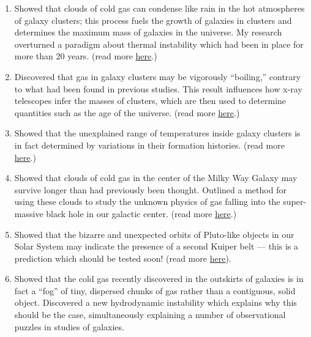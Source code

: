 \documentclass[11pt]{article}
\newenvironment{outerlist}[1][\enskip\textbullet]%
        {\begin{enumerate}[#1]}{\end{enumerate}%
         \vspace{-.6\baselineskip}}
\begin{document}
\begin{outerlist}
  \item Showed that clouds of cold gas can condense like rain in the
    hot atmospheres of galaxy clusters; this process fuels the growth
    of galaxies in clusters and determines the maximum mass of
    galaxies in the universe.  My research overturned a paradigm about
    thermal instability which had been in place for more than 20
    years. (read more \href{http://mkmcc.github.io/research/#sec:ti}{here}.)
  \item Discovered that gas in galaxy clusters may be vigorously
    ``boiling,'' contrary to what had been found in previous studies.
    This result influences how x-ray telescopes infer the masses of clusters,
    which are then used to determine quantities such as the age of the
    universe.  (read more
    \href{http://mkmcc.github.io/research/#sec:mti}{here}.)
  \item Showed that the unexplained range of temperatures inside
    galaxy clusters is in fact determined by variations in their
    formation histories. (read more \href{http://mkmcc.github.io/research/#sec:outer-parts}{here}.)
  \item Showed that clouds of cold gas in the center of the Milky Way
    Galaxy may survive longer than had previously been thought.
    Outlined a method for using these clouds to study the unknown
    physics of gas falling into the super-massive black hole in our
    galactic center. (read more
    \href{http://mkmcc.github.io/research/#sec:g2}{here}.)
  \item Showed that the bizarre and unexpected orbits of Pluto-like
    objects in our Solar System may indicate the presence of a second
    Kuiper belt --- this is a prediction which should be tested soon!
    (read more
    \href{http://mkmcc.github.io/research/index.html#sec:plutos}{here}).
  \item Showed that the cold gas recently discovered in the outskirts
    of galaxies is in fact a ``fog'' of tiny, dispersed chunks of gas
    rather than a contiguous, solid object.  Discovered a new
    hydrodynamic instability which explains why this should be the
    case, simultaneously explaining a number of observational puzzles
    in studies of galaxies.
\end{outerlist}

\restoregeometry
\end{document}
